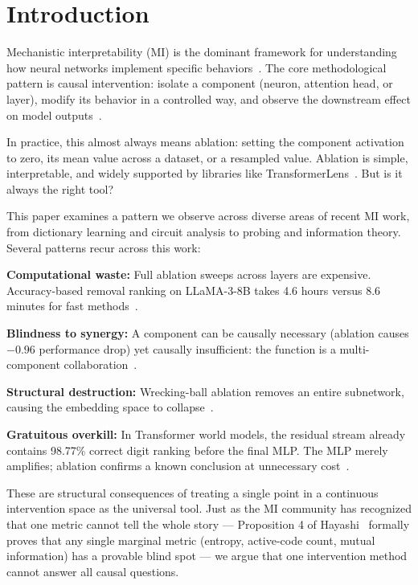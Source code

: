 \documentclass[pdflatex,sn-mathphys-num]{sn-jnl}
\begin{document}
\maketitle

\section{Introduction}
\label{sec:introduction}

Mechanistic interpretability (MI) is the dominant framework for understanding how neural networks implement specific behaviors~\cite{Olah2020,Elhage2022}. The core methodological pattern is causal intervention: isolate a component (neuron, attention head, or layer), modify its behavior in a controlled way, and observe the downstream effect on model outputs~\cite{Vig2020,Wang2022}.

In practice, this almost always means ablation: setting the component activation to zero, its mean value across a dataset, or a resampled value. Ablation is simple, interpretable, and widely supported by libraries like TransformerLens~\cite{NandaBloom2022}. But is it always the right tool?

This paper examines a pattern we observe across diverse areas of recent MI work, from dictionary learning and circuit analysis to probing and information theory. Several patterns recur across this work:

\textbf{Computational waste:} Full ablation sweeps across layers are expensive. Accuracy-based removal ranking on LLaMA-3-8B takes 4.6 hours versus 8.6 minutes for fast methods~\cite{Hinostroza2026}.

\textbf{Blindness to synergy:} A component can be causally necessary (ablation causes $-0.96$ performance drop) yet causally insufficient: the function is a multi-component collaboration~\cite{Rumbelow2026}.

\textbf{Structural destruction:} Wrecking-ball ablation removes an entire subnetwork, causing the embedding space to collapse~\cite{LehnSchioler2026}.

\textbf{Gratuitous overkill:} In Transformer world models, the residual stream already contains 98.77\% correct digit ranking before the final MLP. The MLP merely amplifies; ablation confirms a known conclusion at unnecessary cost~\cite{KniazevFijalkow2026}.

These are structural consequences of treating a single point in a continuous intervention space as the universal tool. Just as the MI community has recognized that one metric cannot tell the whole story --- Proposition 4 of Hayashi~\cite{Hayashi2026} formally proves that any single marginal metric (entropy, active-code count, mutual information) has a provable blind spot --- we argue that one intervention method cannot answer all causal questions.
\end{document}
